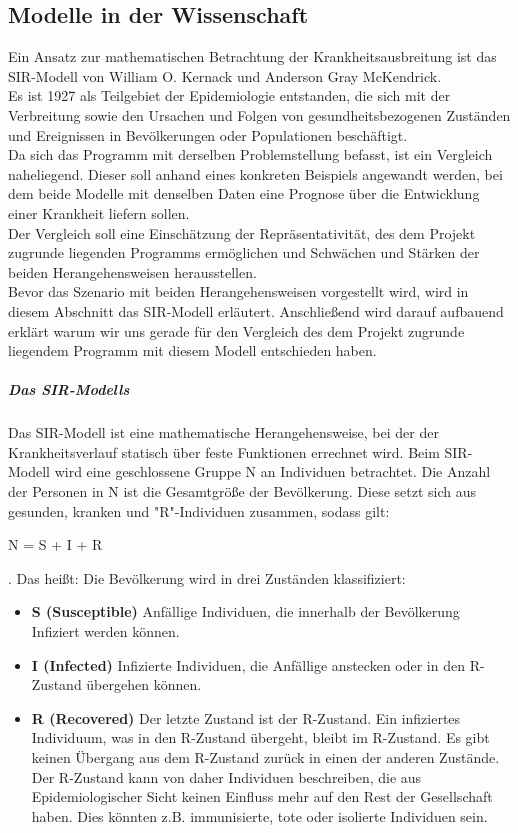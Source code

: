 \subsection*{Modelle in der Wissenschaft}
Ein Ansatz zur mathematischen Betrachtung der Krankheitsausbreitung ist das SIR-Modell von William O. Kernack und Anderson Gray McKendrick.\\
Es ist 1927 als Teilgebiet der Epidemiologie entstanden, die sich mit der Verbreitung sowie den Ursachen und Folgen von gesundheitsbezogenen Zuständen und Ereignissen in Bevölkerungen oder Populationen beschäftigt.\\
Da sich das Programm mit derselben Problemstellung befasst, ist ein Vergleich naheliegend.
Dieser soll anhand eines konkreten Beispiels angewandt werden, bei dem beide Modelle mit denselben Daten eine Prognose über die Entwicklung einer Krankheit liefern sollen.\\
Der Vergleich soll eine Einschätzung der Repräsentativität, des dem Projekt zugrunde liegenden Programms ermöglichen und Schwächen und Stärken der beiden Herangehensweisen herausstellen.\\
Bevor das Szenario mit beiden Herangehensweisen vorgestellt wird, wird in diesem Abschnitt das SIR-Modell erläutert. Anschließend wird darauf aufbauend erklärt warum wir uns gerade für den Vergleich des dem Projekt zugrunde liegendem Programm mit diesem Modell entschieden haben.

\subparagraph{Das SIR-Modells}
Das SIR-Modell ist eine mathematische Herangehensweise, bei der der Krankheitsverlauf statisch über feste Funktionen errechnet wird.
Beim SIR-Modell wird eine geschlossene Gruppe N an Individuen betrachtet. Die Anzahl der Personen in N ist die Gesamtgröße der Bevölkerung.
Diese setzt sich aus gesunden, kranken und "R"-Individuen zusammen, sodass gilt:

N = S + I + R

. Das heißt: Die Bevölkerung wird in drei Zuständen klassifiziert:
\begin{itemize}
\item \textbf{S (Susceptible)} Anfällige Individuen, die innerhalb der Bevölkerung Infiziert werden können.
\item \textbf{I (Infected)} Infizierte Individuen, die Anfällige anstecken  oder in den R-Zustand übergehen können.
\item \textbf{R (Recovered)} Der letzte Zustand ist der R-Zustand. Ein infiziertes Individuum, was in den R-Zustand übergeht, bleibt im R-Zustand. Es gibt keinen Übergang aus dem R-Zustand zurück in einen der anderen Zustände. Der R-Zustand kann von daher Individuen beschreiben, die aus Epidemiologischer Sicht keinen Einfluss mehr auf den Rest der Gesellschaft haben. Dies könnten z.B. immunisierte, tote oder isolierte Individuen sein.
\end{itemize}


